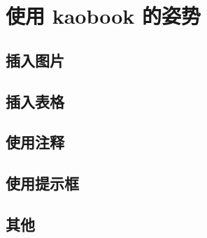 \setchapterpreamble[u]{\margintoc}
\chapter{使用 kaobook 的姿势}


\section{插入图片}

\section{插入表格}

\section{使用注释}

\section{使用提示框}


\section{其他}
